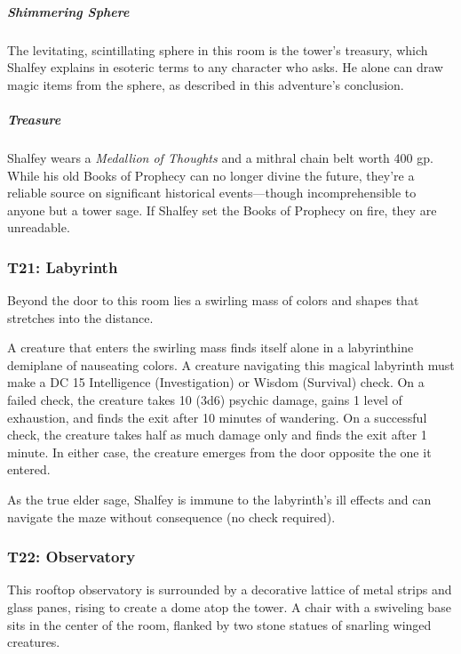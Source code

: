 \documentclass[10pt,a4paper,twoside,bg=print,twocolumn,openany,nodeprecatedcode]{dndbook}
\begin{document}
\subparagraph{Shimmering Sphere}
The levitating, scintillating sphere in this room is the tower's treasury, which Shalfey explains in esoteric terms to any character who asks. He alone can draw magic items from the sphere, as described in this adventure's conclusion.

\subparagraph{Treasure}
Shalfey wears a \textit{Medallion of Thoughts} and a mithral chain belt worth 400 gp. While his old Books of Prophecy can no longer divine the future, they're a reliable source on significant historical events—though incomprehensible to anyone but a tower sage. If Shalfey set the Books of Prophecy on fire, they are unreadable.

\subsubsection{T21: Labyrinth}
\begin{DndReadAloud}{}
Beyond the door to this room lies a swirling mass of colors and shapes that stretches into the distance.

\end{DndReadAloud}

A creature that enters the swirling mass finds itself alone in a labyrinthine demiplane of nauseating colors. A creature navigating this magical labyrinth must make a DC 15 Intelligence (Investigation) or Wisdom (Survival) check. On a failed check, the creature takes 10 (3d6) psychic damage, gains 1 level of exhaustion, and finds the exit after 10 minutes of wandering. On a successful check, the creature takes half as much damage only and finds the exit after 1 minute. In either case, the creature emerges from the door opposite the one it entered.

As the true elder sage, Shalfey is immune to the labyrinth's ill effects and can navigate the maze without consequence (no check required).

\subsubsection{T22: Observatory}
\begin{DndReadAloud}{}
This rooftop observatory is surrounded by a decorative lattice of metal strips and glass panes, rising to create a dome atop the tower. A chair with a swiveling base sits in the center of the room, flanked by two stone statues of snarling winged creatures.

\end{DndReadAloud}
\end{document}

